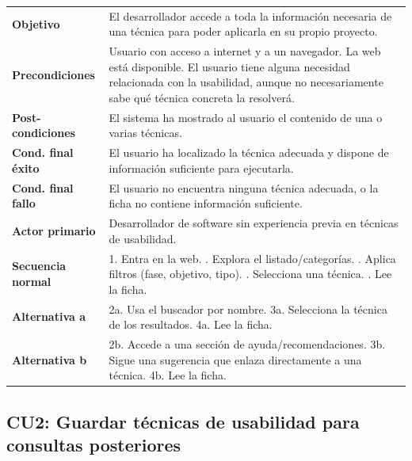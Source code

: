\documentclass[12pt, a4paper]{report}
\begin{document}
\begin{longtable}{lp{10cm}}
\toprule
\textbf{Objetivo} & El desarrollador accede a toda la información necesaria de una técnica para poder aplicarla en su propio proyecto. \\
\textbf{Precondiciones} & Usuario con acceso a internet y a un navegador. La web está disponible. El usuario tiene alguna necesidad relacionada con la usabilidad, aunque no necesariamente sabe qué técnica concreta la resolverá. \\
\textbf{Post-condiciones} & El sistema ha mostrado al usuario el contenido de una o varias técnicas. \\
\textbf{Cond. final éxito} & El usuario ha localizado la técnica adecuada y dispone de información suficiente para ejecutarla. \\
\textbf{Cond. final fallo} & El usuario no encuentra ninguna técnica adecuada, o la ficha no contiene información suficiente. \\
\textbf{Actor primario} & Desarrollador de software sin experiencia previa en técnicas de usabilidad. \\
\midrule
\textbf{Secuencia normal} & 1. Entra en la web. \newline 2. Explora el listado/categorías. \newline 3. Aplica filtros (fase, objetivo, tipo). \newline 4. Selecciona una técnica. \newline 5. Lee la ficha. \\
\textbf{Alternativa a} & 2a. Usa el buscador por nombre. \newline 3a. Selecciona la técnica de los resultados. \newline 4a. Lee la ficha. \\
\textbf{Alternativa b} & 2b. Accede a una sección de ayuda/recomendaciones. \newline 3b. Sigue una sugerencia que enlaza directamente a una técnica. \newline 4b. Lee la ficha. \\
\bottomrule
\end{longtable}

\subsection{CU2: Guardar técnicas de usabilidad para consultas posteriores}
\end{document}
